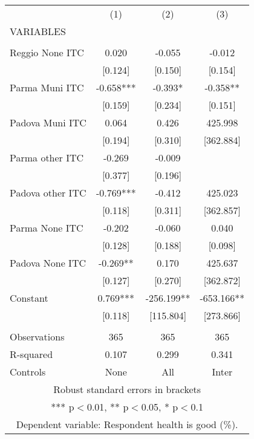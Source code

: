 \begin{tabular}{lccc} \hline
 & (1) & (2) & (3) \\
VARIABLES &  &  &  \\ \hline
 &  &  &  \\
Reggio None ITC & 0.020 & -0.055 & -0.012 \\
 & [0.124] & [0.150] & [0.154] \\
Parma Muni ITC & -0.658*** & -0.393* & -0.358** \\
 & [0.159] & [0.234] & [0.151] \\
Padova Muni ITC & 0.064 & 0.426 & 425.998 \\
 & [0.194] & [0.310] & [362.884] \\
Parma other ITC & -0.269 & -0.009 &  \\
 & [0.377] & [0.196] &  \\
Padova other ITC & -0.769*** & -0.412 & 425.023 \\
 & [0.118] & [0.311] & [362.857] \\
Parma None ITC & -0.202 & -0.060 & 0.040 \\
 & [0.128] & [0.188] & [0.098] \\
Padova None ITC & -0.269** & 0.170 & 425.637 \\
 & [0.127] & [0.270] & [362.872] \\
Constant & 0.769*** & -256.199** & -653.166** \\
 & [0.118] & [115.804] & [273.866] \\
 &  &  &  \\
Observations & 365 & 365 & 365 \\
R-squared & 0.107 & 0.299 & 0.341 \\
 Controls & None & All & Inter \\ \hline
\multicolumn{4}{c}{ Robust standard errors in brackets} \\
\multicolumn{4}{c}{ *** p$<$0.01, ** p$<$0.05, * p$<$0.1} \\
\multicolumn{4}{c}{ Dependent variable: Respondent health is good (\%).} \\
\end{tabular}
